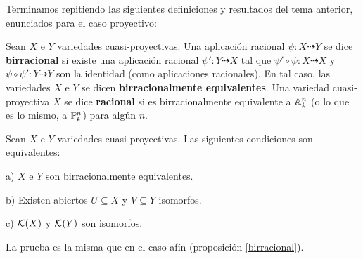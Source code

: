\documentclass[ACGA.tex]{subfiles}
\begin{document}
Terminamos repitiendo las siguientes definiciones y resultados del tema anterior, enunciados para el caso proyectivo:

\begin{defi}
 Sean $X$ e $Y$ variedades cuasi-proyectivas. Una aplicación racional $\psi:X\dashrightarrow Y$ se dice {\bf birracional} si existe una aplicación racional $\psi':Y\dashrightarrow X$ tal que $\psi'\circ\psi:X\dashrightarrow X$ y $\psi\circ\psi':Y\dashrightarrow Y$ son la identidad (como aplicaciones racionales). En tal caso, las variedades $X$ e $Y$ se dicen {\bf birracionalmente equivalentes}. Una variedad cuasi-proyectiva $X$ se dice {\bf racional} si es birracionalmente equivalente a $\mathbb{A}^n_k$ (o lo que es lo mismo, a $\mathbb{P}^n_k$) para algún $n$.
\end{defi}

\begin{prop}\label{birracproy}
 Sean $X$ e $Y$ variedades cuasi-proyectivas. Las siguientes condiciones son equivalentes:

a) $X$ e $Y$ son birracionalmente equivalentes.

b) Existen abiertos $U\subseteq X$ y $V\subseteq Y$ isomorfos.

c) ${\mathcal K}(X)$ y ${\mathcal K}(Y)$ son isomorfos. 

\end{prop}

La prueba es la misma que en el caso afín (proposición \ref{birracional}).
\end{document}
